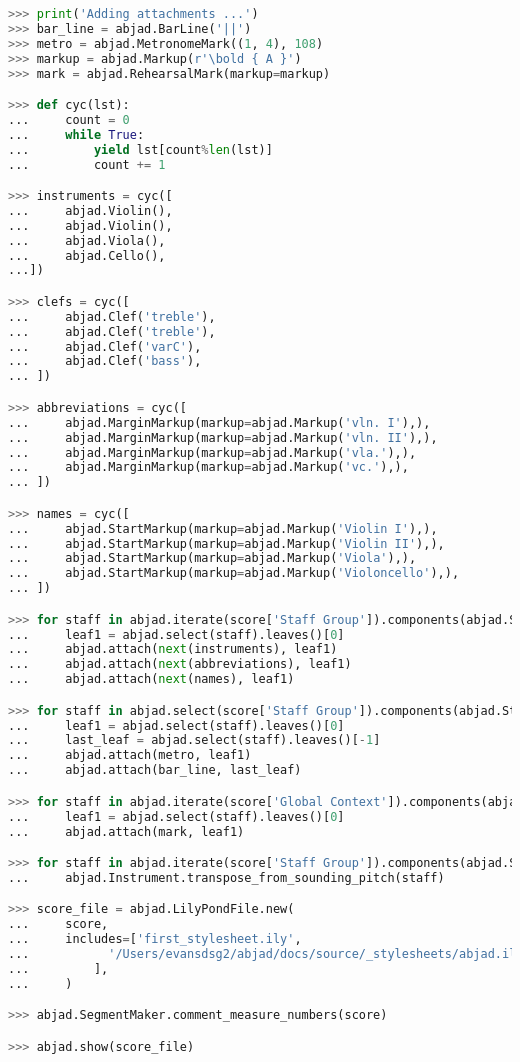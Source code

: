 \begin{lstlisting}[language=Python, caption=Demonstration of AttachmentHandlers]
>>> print('Adding attachments ...')
>>> bar_line = abjad.BarLine('||')
>>> metro = abjad.MetronomeMark((1, 4), 108)
>>> markup = abjad.Markup(r'\bold { A }')
>>> mark = abjad.RehearsalMark(markup=markup)

>>> def cyc(lst):
...     count = 0
...     while True:
...         yield lst[count%len(lst)]
...         count += 1

>>> instruments = cyc([
...     abjad.Violin(),
...     abjad.Violin(),
...     abjad.Viola(),
...     abjad.Cello(),
...])

>>> clefs = cyc([
...     abjad.Clef('treble'),
...     abjad.Clef('treble'),
...     abjad.Clef('varC'),
...     abjad.Clef('bass'),
... ])

>>> abbreviations = cyc([
...     abjad.MarginMarkup(markup=abjad.Markup('vln. I'),),
...     abjad.MarginMarkup(markup=abjad.Markup('vln. II'),),
...     abjad.MarginMarkup(markup=abjad.Markup('vla.'),),
...     abjad.MarginMarkup(markup=abjad.Markup('vc.'),),
... ])

>>> names = cyc([
...     abjad.StartMarkup(markup=abjad.Markup('Violin I'),),
...     abjad.StartMarkup(markup=abjad.Markup('Violin II'),),
...     abjad.StartMarkup(markup=abjad.Markup('Viola'),),
...     abjad.StartMarkup(markup=abjad.Markup('Violoncello'),),
... ])

>>> for staff in abjad.iterate(score['Staff Group']).components(abjad.Staff):
...     leaf1 = abjad.select(staff).leaves()[0]
...     abjad.attach(next(instruments), leaf1)
...     abjad.attach(next(abbreviations), leaf1)
...     abjad.attach(next(names), leaf1)

>>> for staff in abjad.select(score['Staff Group']).components(abjad.Staff)[0]:
...     leaf1 = abjad.select(staff).leaves()[0]
...     last_leaf = abjad.select(staff).leaves()[-1]
...     abjad.attach(metro, leaf1)
...     abjad.attach(bar_line, last_leaf)

>>> for staff in abjad.iterate(score['Global Context']).components(abjad.Staff):
...     leaf1 = abjad.select(staff).leaves()[0]
...     abjad.attach(mark, leaf1)

>>> for staff in abjad.iterate(score['Staff Group']).components(abjad.Staff):
...     abjad.Instrument.transpose_from_sounding_pitch(staff)

>>> score_file = abjad.LilyPondFile.new(
...     score,
...     includes=['first_stylesheet.ily',
...			  '/Users/evansdsg2/abjad/docs/source/_stylesheets/abjad.ily'
...			],
...     )

>>> abjad.SegmentMaker.comment_measure_numbers(score)

>>> abjad.show(score_file)
\end{lstlisting}
\doublespace

